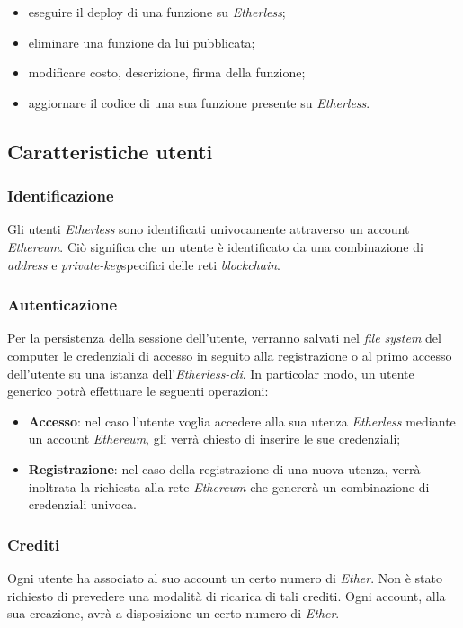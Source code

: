 \begin{itemize}
	\item eseguire il deploy di una funzione su \textit{Etherless};
	\item eliminare una funzione da lui pubblicata;
	\item modificare costo, descrizione, firma della funzione;
	\item aggiornare il codice di una sua funzione presente su \textit{Etherless}.
\end{itemize}



\subsection{Caratteristiche utenti}

\subsubsection{Identificazione}
Gli utenti \textit{Etherless} sono identificati univocamente attraverso un account \textit{Ethereum\glos}. Ciò significa che un utente è identificato da una combinazione di \textit{address} e \textit{private-key}\glo specifici delle reti \textit{blockchain\glos}.

\subsubsection{Autenticazione}
Per la persistenza della sessione dell'utente, verranno salvati nel \textit{file system\glo} del computer le credenziali di accesso in seguito alla registrazione o al primo accesso dell'utente su una istanza dell'\textit{Etherless-cli}. In particolar modo, un utente generico potrà effettuare le seguenti operazioni:
\begin{itemize}
	\item \textbf{Accesso}: nel caso l'utente voglia accedere alla sua utenza \textit{Etherless} mediante un account \textit{Ethereum\glos}, gli verrà chiesto di inserire le sue credenziali;
	\item \textbf{Registrazione}: nel caso della registrazione di una nuova utenza, verrà inoltrata la richiesta alla rete \textit{Ethereum\glo} che genererà un combinazione di credenziali univoca.
\end{itemize}
\subsubsection{Crediti}
Ogni utente ha associato al suo account un certo numero di \textit{Ether\glos}. Non è stato richiesto di prevedere una modalità di ricarica di tali crediti. Ogni account, alla sua creazione, avrà a disposizione un certo numero di \textit{Ether\glos}.

